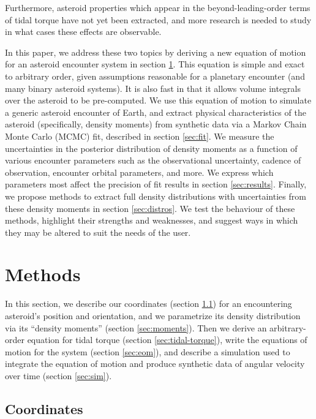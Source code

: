 \documentclass[fleqn,usenatbib]{mnras}
\begin{document}
Furthermore, asteroid properties which appear in the beyond-leading-order terms of tidal torque have not yet been extracted, and more research is needed to study in what cases these effects are observable.

In this paper, we address these two topics by deriving a new equation of motion for an asteroid encounter system in section \ref{sec:methods}. This equation is simple and exact to arbitrary order, given assumptions reasonable for a planetary encounter (and many binary asteroid systems). It is also fast in that it allows volume integrals over the asteroid to be pre-computed. We use this equation of motion to simulate a generic asteroid encounter of Earth, and extract physical characteristics of the asteroid (specifically, density moments) from synthetic data via a Markov Chain Monte Carlo (MCMC) fit, described in section \ref{sec:fit}. We measure the uncertainties in the posterior distribution of density moments as a function of various encounter parameters such as the observational uncertainty, cadence of observation, encounter orbital parameters, and more. We express which parameters most affect the precision of fit results in section \ref{sec:results}. Finally, we propose methods to extract full density distributions with uncertainties from these density moments in section \ref{sec:distros}. We test the behaviour of these methods, highlight their strengths and weaknesses, and suggest ways in which they may be altered to suit the needs of the user.

\section{Methods}
\label{sec:methods}

In this section, we describe our coordinates (section \ref{sec:coordinates}) for an encountering asteroid's position and orientation, and we parametrize its density distribution via its ``density moments'' (section \ref{sec:moments}). Then we derive an arbitrary-order equation for tidal torque (section \ref{sec:tidal-torque}), write the equations of motion for the system (section \ref{sec:eom}), and describe a simulation used to integrate the equation of motion and produce synthetic data of angular velocity over time (section \ref{sec:sim}).

\subsection{Coordinates}
\label{sec:coordinates}
\end{document}
